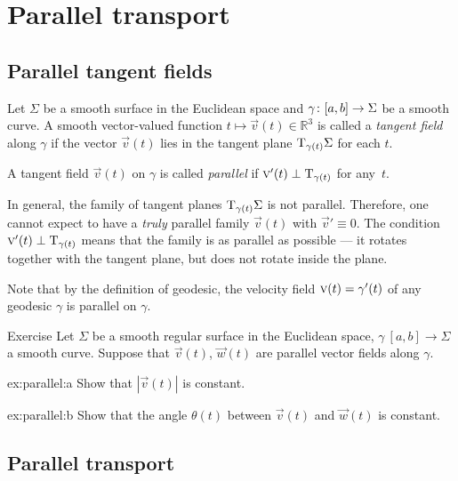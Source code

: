 \chapter{Parallel transport}
\label{chap:parallel-transport}

\section{Parallel tangent fields}

Let $\Sigma$ be a smooth surface in the Euclidean space and $\gamma\:[a,b]\z\to \Sigma$ be a smooth curve.
A smooth vector-valued function $t\mapsto {\vec v}(t) \in \mathbb{R}^3$ is called a \emph{tangent field} along $\gamma$ if
the vector ${\vec v}(t)$ lies in the tangent plane $\mathrm{T}_{\gamma(t)}\Sigma$ for each $t$.

A tangent field ${\vec v}(t)$ on $\gamma$ is called \emph{parallel} if ${\text{\sc{v}}}'(t)\perp\mathrm{T}_{\gamma(t)}$ for any~$t$.

In general, the family of tangent planes $\mathrm{T}_{\gamma(t)}\Sigma$ is not parallel.
Therefore, one cannot expect to have a {}\emph{truly} parallel family ${\vec v}(t)$ with ${\vec v}'\equiv 0$.
The condition ${\text{\sc{v}}}'(t)\perp\mathrm{T}_{\gamma(t)}$ means that the family is as parallel as possible --- it rotates together with the tangent plane, but does not rotate inside the plane.

Note that by the definition of geodesic, the velocity field ${\vec v}(t)\z=\gamma'(t)$ of any geodesic $\gamma$ is parallel on $\gamma$.

\begin{thm}{Exercise}\label{ex:parallel}
Let $\Sigma$ be a smooth regular surface in the Euclidean space, 
$\gamma\:[a,b]\to \Sigma$ a smooth curve.
Suppose that ${\vec v}(t)$, $\vec w(t)$ are parallel vector fields along $\gamma$.

\begin{subthm}{ex:parallel:a} Show that $|{\vec v}(t)|$ is constant.
\end{subthm}

\begin{subthm}{ex:parallel:b} Show that the angle $\theta(t)$ between ${\vec v}(t)$ and $\vec w(t)$ is constant.
\end{subthm}

\end{thm}

\section{Parallel transport}

